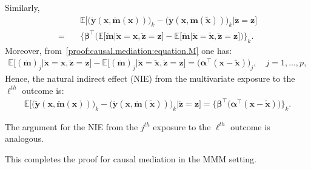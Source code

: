 \documentclass[
  12pt]{article}
\def\E{\mathbb{E}}
\begin{document}
Similarly,  
\begin{align*}
& \E \big[ \big( \ddot{\mathbf{y}}(\mathbf{x},\ddot{\mathbf{m}}(\mathbf{x})) \big)_{k} - \big( \ddot{\mathbf{y}}(\mathbf{x},\ddot{\mathbf{m}}(\widetilde{\mathbf{x}})) \big)_{k} \big| \ddot{\mathbf{z}} = \mathbf{z} \big]  
\\
= \quad & \Big\{ \bm{\beta}^{\top} \Big( \E \big[  \ddot{\mathbf{m}}  \big| \ddot{\mathbf{x}} = \mathbf{x} , \ddot{\mathbf{z}} = \mathbf{z} \big] - \E \big[  \ddot{\mathbf{m}}  \big| \ddot{\mathbf{x}} = \widetilde{\mathbf{x}} , \ddot{\mathbf{z}}= \mathbf{z} \big] \Big) \Big\}_{k}.
\end{align*}
Moreover,   from~\eqref{proof:causal.mediation:equation.M} one has: 
\begin{align*}
\E \big[  (\ddot{\mathbf{m}})_{j}  \big| \ddot{\mathbf{x}} = \mathbf{x} , \ddot{\mathbf{z}} = \mathbf{z} \big] - \E \big[  (\ddot{\mathbf{m}})_{j}  \big| \ddot{\mathbf{x}} = \widetilde{\mathbf{x}} , \ddot{\mathbf{z}} = \mathbf{z} \big] = \big( \bm{\alpha}^{\top} (\mathbf{x} - \widetilde{\mathbf{x}}) \big)_{j} , \quad j = 1, ..., p,  
\end{align*}
Hence, the natural indirect effect (NIE) from the multivariate exposure to the $\ell^{th}$ outcome is:   
\begin{align*}
\E \big[ \big( \ddot{\mathbf{y}}(\mathbf{x},\ddot{\mathbf{m}}(\mathbf{x})) \big)_{k} - \big( \ddot{\mathbf{y}}(\mathbf{x},\ddot{\mathbf{m}}(\widetilde{\mathbf{x}})) \big)_{k} \big| \ddot{\mathbf{z}} = \mathbf{z} \big]    =  \Big\{   \bm{\beta}^{\top} \big( \bm{\alpha}^{\top} (\mathbf{x} - \widetilde{\mathbf{x}}) \big) \Big\}_{k} .
\end{align*}

The argument for the NIE from the $j^{th}$ exposure to the $\ell^{th}$ outcome is analogous.

This completes the proof for causal mediation in the MMM setting. 
\end{document}
